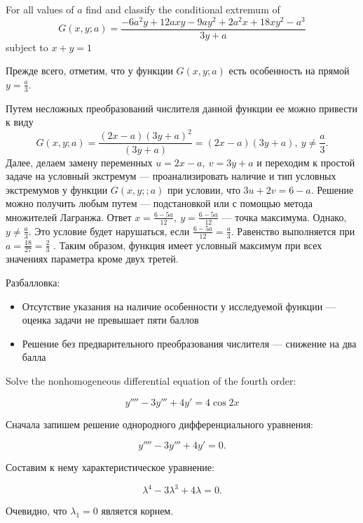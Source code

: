 \documentclass[addpoints, answers]{exam} %
\begin{document}
\begin{questions}
\question[10] For all values of $a$ find and classify the conditional extremum of
\[
G\left(x,y;a\right)=\frac{-6a^2y+12axy-9ay^2+2a^2x+18xy^2-a^3}{3y+a}
\]
subject to $x + y = 1$

\begin{solution}
Прежде всего, отметим, что у функции $G\left(x,y;a\right)$ есть особенность на прямой $y=\frac{a}{3}$.

Путем несложных преобразований числителя данной функции ее можно привести к виду
\[
G\left(x,y;a\right)=\frac{\left(2x-a\right){\left(3y+a\right)}^2}{\left(3y+a\right)}=\left(2x-a\right)\left(3y+a\right),\ y\ne \frac{a}{3}.
\]
Далее, делаем замену переменных $u=2x-a,\ v=3y+a$ и переходим к простой задаче на условный экстремум --- проанализировать наличие и тип условных экстремумов у функции $G\left(x,y;;a\right)$ при условии, что $3u+2v=6-a$. Решение можно получить любым путем --- подстановкой или с помощью метода множителей Лагранжа. Ответ $x=\frac{6-5a}{12},\ y=\frac{6-5a}{12}$ --- точка максимума. Однако, $y\ne \frac{a}{3}$. Это условие будет нарушаться, если $\frac{6-5a}{12}=\frac{a}{3}$. Равенство выполняется при $a=\frac{18}{27}=\frac{2}{3}$ . Таким образом, функция имеет условный максимум при всех значениях параметра кроме двух третей.

Разбалловка:
\begin{itemize}
\item Отсутствие указания на наличие особенности у исследуемой функции --- оценка задачи не превышает пяти баллов
\item Решение без предварительного преобразования числителя --- снижение на два балла
\end{itemize}

\end{solution}





\question[10] Solve the nonhomogeneous differential equation of the fourth order:

\[
y'''' -3y''' +4y' =4\cos 2x
\]

\begin{solution}
Сначала запишем решение однородного дифференциального уравнения:

\[y'''' -3y''' +4y' =0.\]

Составим к нему характеристическое уравнение:

\[\lambda ^{4} -3\lambda ^{3} +4\lambda =0.\]

Очевидно, что $\lambda _{1} =0$ является корнем.


\end{solution}
\end{questions}
\end{document}
